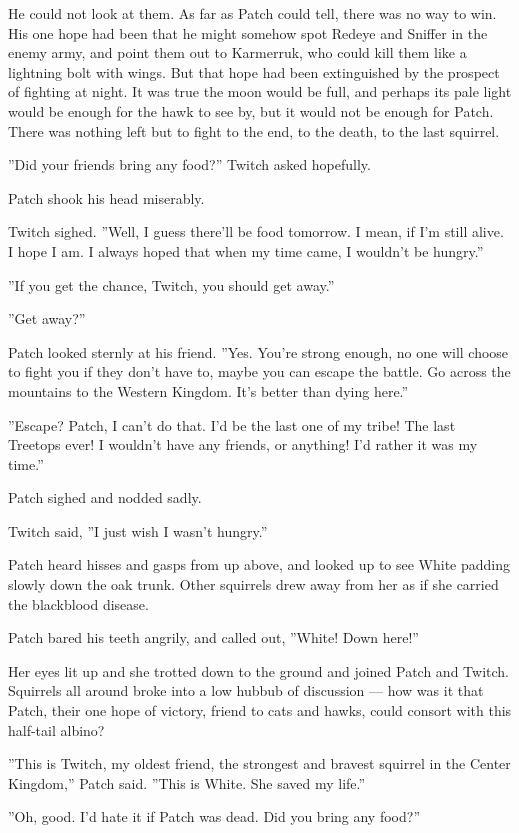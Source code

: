 \documentclass[12pt]{book}
\begin{document}
He could not look at them. As far as Patch could tell, there was no
way to win. His one hope had been that he might somehow spot Redeye
and Sniffer in the enemy army, and point them out to Karmerruk, who
could kill them like a lightning bolt with wings. But that hope had
been extinguished by the prospect of fighting at night. It was true
the moon would be full, and perhaps its pale light would be enough for
the hawk to see by, but it would not be enough for Patch. There was
nothing left but to fight to the end, to the death, to the last
squirrel.

''Did your friends bring any food?'' Twitch asked hopefully.

Patch shook his head miserably.

Twitch sighed. ''Well, I guess there'll be food tomorrow. I mean, if
I'm still alive. I hope I am. I always hoped that when my time came, I
wouldn't be hungry.''

''If you get the chance, Twitch, you should get away.''

''Get away?''

Patch looked sternly at his friend. ''Yes. You're strong enough, no
one will choose to fight you if they don't have to, maybe you can
escape the battle. Go across the mountains to the Western
Kingdom. It's better than dying here.''

''Escape? Patch, I can't do that. I'd be the last one of my tribe! The
last Treetops ever! I wouldn't have any friends, or anything! I'd
rather it was my time.''

Patch sighed and nodded sadly.

Twitch said, ''I just wish I wasn't hungry.''

Patch heard hisses and gasps from up above, and looked up to see White
padding slowly down the oak trunk. Other squirrels drew away from her
as if she carried the blackblood disease.

Patch bared his teeth angrily, and called out, ''White! Down here!''

Her eyes lit up and she trotted down to the ground and joined Patch
and Twitch. Squirrels all around broke into a low hubbub of discussion
--- how was it that Patch, their one hope of victory, friend to cats
and hawks, could consort with this half-tail albino?

''This is Twitch, my oldest friend, the strongest and bravest squirrel
in the Center Kingdom,'' Patch said. ''This is White. She saved my
life.''

''Oh, good. I'd hate it if Patch was dead. Did you bring any food?''
\end{document}
